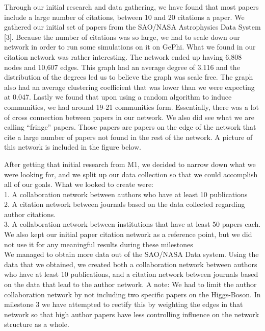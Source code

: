 \documentclass[times, 10pt,twocolumn]{article}
\begin{document}
Through our initial research and data gathering, we have found that most papers include a large number of citations, between 10 and 20 citations a paper. We gathered our initial set of papers from the SAO/NASA Astrophysics Data System [3]. Because the number of citations was so large, we had to scale down our network in order to run some simulations on it on GePhi. What we found in our citation network was rather interesting. The network ended up having 6,808 nodes and 10,607 edges. This graph had an average degree of 3.116 and the distribution of the degrees led us to believe the graph was scale free. The graph also had an average clustering coefficient that was lower than we were expecting at 0.047. Lastly we found that upon using a random algorithm to induce communities, we had around 19-21 communities form. Essentially, there was a lot of cross connection between papers in our network. We also did see what we are calling “fringe” papers. Those papers are papers on the edge of the network that cite a large number of papers not found in the rest of the network. A picture of this network is included in the figure below.

After getting that initial research from M1, we decided to narrow down what we were looking for, and we split up our data collection so that we could accomplish all of our goals. What we looked to create were: \\
1. A collaboration network between authors who have at least 10 publications \\
2. A citation network between journals based on the data collected regarding author citations.\\
3. A collaboration network between institutions that have at least 50 papers each.\\

We also kept our initial paper citation network as a reference point, but we did not use it for any meaningful results during these milestones \\

We managed to obtain more data out of the SAO/NASA Data system. Using the data that we obtained, we created both a collaboration network between authors who have at least 10 publications, and a citation network between journals based on the data that lead to the author network. A note: We had to limit the author collaboration network by not including two specific papers on the Higgs-Boson. In milestone 3 we have attempted to rectify this by weighting the edges in that network so that high author papers have less controlling influence on the network structure as a whole. \\
\end{document}
